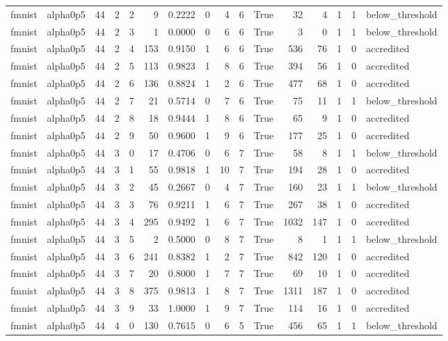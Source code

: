 \begin{tabular}{llrrrrrrrrrrrrrl}
fmnist & alpha0p5 & 44 & 2 & 2 & 9 & 0.2222 & 0 & 4 & 6 & True & 32 & 4 & 1 & 1 & below\_threshold \\
fmnist & alpha0p5 & 44 & 2 & 3 & 1 & 0.0000 & 0 & 6 & 6 & True & 3 & 0 & 1 & 1 & below\_threshold \\
fmnist & alpha0p5 & 44 & 2 & 4 & 153 & 0.9150 & 1 & 6 & 6 & True & 536 & 76 & 1 & 0 & accredited \\
fmnist & alpha0p5 & 44 & 2 & 5 & 113 & 0.9823 & 1 & 8 & 6 & True & 394 & 56 & 1 & 0 & accredited \\
fmnist & alpha0p5 & 44 & 2 & 6 & 136 & 0.8824 & 1 & 2 & 6 & True & 477 & 68 & 1 & 0 & accredited \\
fmnist & alpha0p5 & 44 & 2 & 7 & 21 & 0.5714 & 0 & 7 & 6 & True & 75 & 11 & 1 & 1 & below\_threshold \\
fmnist & alpha0p5 & 44 & 2 & 8 & 18 & 0.9444 & 1 & 8 & 6 & True & 65 & 9 & 1 & 0 & accredited \\
fmnist & alpha0p5 & 44 & 2 & 9 & 50 & 0.9600 & 1 & 9 & 6 & True & 177 & 25 & 1 & 0 & accredited \\
fmnist & alpha0p5 & 44 & 3 & 0 & 17 & 0.4706 & 0 & 6 & 7 & True & 58 & 8 & 1 & 1 & below\_threshold \\
fmnist & alpha0p5 & 44 & 3 & 1 & 55 & 0.9818 & 1 & 10 & 7 & True & 194 & 28 & 1 & 0 & accredited \\
fmnist & alpha0p5 & 44 & 3 & 2 & 45 & 0.2667 & 0 & 4 & 7 & True & 160 & 23 & 1 & 1 & below\_threshold \\
fmnist & alpha0p5 & 44 & 3 & 3 & 76 & 0.9211 & 1 & 6 & 7 & True & 267 & 38 & 1 & 0 & accredited \\
fmnist & alpha0p5 & 44 & 3 & 4 & 295 & 0.9492 & 1 & 6 & 7 & True & 1032 & 147 & 1 & 0 & accredited \\
fmnist & alpha0p5 & 44 & 3 & 5 & 2 & 0.5000 & 0 & 8 & 7 & True & 8 & 1 & 1 & 1 & below\_threshold \\
fmnist & alpha0p5 & 44 & 3 & 6 & 241 & 0.8382 & 1 & 2 & 7 & True & 842 & 120 & 1 & 0 & accredited \\
fmnist & alpha0p5 & 44 & 3 & 7 & 20 & 0.8000 & 1 & 7 & 7 & True & 69 & 10 & 1 & 0 & accredited \\
fmnist & alpha0p5 & 44 & 3 & 8 & 375 & 0.9813 & 1 & 8 & 7 & True & 1311 & 187 & 1 & 0 & accredited \\
fmnist & alpha0p5 & 44 & 3 & 9 & 33 & 1.0000 & 1 & 9 & 7 & True & 114 & 16 & 1 & 0 & accredited \\
fmnist & alpha0p5 & 44 & 4 & 0 & 130 & 0.7615 & 0 & 6 & 5 & True & 456 & 65 & 1 & 1 & below\_threshold \\

\end{tabular}
